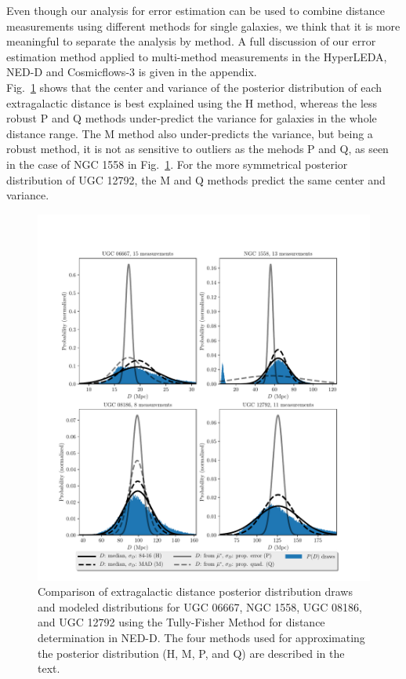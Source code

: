 \documentclass[a4paper,fleqn,usenatbib]{mnras}
\begin{document}
Even though our analysis for error estimation can be used to combine distance measurements using different methods for single galaxies, we think that it is more meaningful to separate the analysis by method. A full discussion of our error estimation method applied to multi-method measurements in the HyperLEDA, NED-D and Cosmicflows-3 is given in the appendix.\\

Fig.~\ref{fig:comp} shows that the center and variance of the posterior distribution of each extragalactic distance is best explained using the H method, whereas the less robust P and Q methods under-predict the variance for galaxies in the whole distance range. The M method also under-predicts the variance, but being a robust method, it is not as sensitive to outliers as the mehods P and Q, as seen in the case of NGC 1558 in Fig.~\ref{fig:comp}. For the more symmetrical posterior distribution of UGC 12792, the M and Q methods predict the same center and variance. \\

\begin{figure}

	\includegraphics[scale=0.7]{comp}
    \caption{Comparison of extragalactic distance posterior distribution draws and modeled distributions for UGC 06667, NGC 1558, UGC 08186, and UGC 12792 using the Tully-Fisher Method for distance determination in NED-D. The four methods used for approximating the posterior distribution (H, M, P, and Q) are described in the text. }
    \label{fig:comp}
\end{figure}
\end{document}
